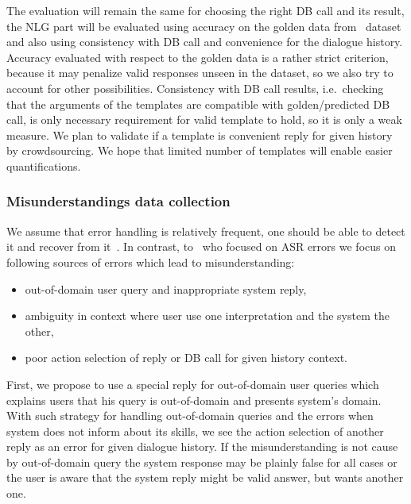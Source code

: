 \documentclass[11pt]{article}
\begin{document}
The evaluation will remain the same for choosing the right DB call and its result, the NLG part will be evaluated using accuracy on the golden data from~\cite{platek2016wochat} dataset and also using consistency with DB call and convenience for the dialogue history.
Accuracy evaluated with respect to the golden data is a rather strict criterion, because it may penalize valid responses unseen in the dataset, so we also try to account for other possibilities.
Consistency with DB call results, i.e.\ checking that the arguments of the templates are compatible with golden/predicted DB call, is only necessary requirement for valid template to hold, so it is only a weak measure.
We plan to validate if a template is convenient reply for given history by crowdsourcing.
We hope that limited number of templates will enable easier quantifications.

\subsubsection*{Misunderstandings data collection}
We assume that error handling is relatively frequent, one should be able to detect it and recover from it~\cite{skantze_error_2007}.
In contrast, to~\cite{skantze_error_2007} who focused on ASR errors we focus on following sources of errors which lead to misunderstanding:
\begin{itemize}
    \item out-of-domain user query and inappropriate system reply,
    \item ambiguity in context where user use one interpretation and the system the other,
    \item poor action selection of reply or DB call for given history context.
\end{itemize}
First, we propose to use a special reply for out-of-domain user queries which explains users that his query is out-of-domain and presents system's domain.~\cite{platek_self_2015}
With such strategy for handling out-of-domain queries and the errors when system does not inform about its skills, we see the action selection of another reply as an error for given dialogue history.
If the misunderstanding is not cause by out-of-domain query the system response may be plainly false for all cases or the user is aware that the system reply might be valid answer, but wants another one.
\end{document}
